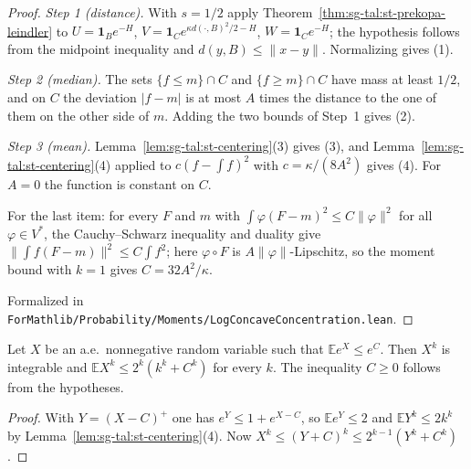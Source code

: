 \begin{proof}
  \leanok
\emph{Step 1 (distance).} With $s=1/2$ apply Theorem~\ref{thm:sg-tal:st-prekopa-leindler} to
$U=\mathbf 1_Be^{-H}$, $V=\mathbf 1_Ce^{\kappa d(\cdot,B)^2/2-H}$, $W=\mathbf 1_Ce^{-H}$; the hypothesis follows
from the midpoint inequality and $d(y,B)\le\|x-y\|$. Normalizing gives (1).

\emph{Step 2 (median).} The sets $\{f\le m\}\cap C$ and $\{f\ge m\}\cap C$ have mass at least $1/2$, and on
$C$ the deviation $|f-m|$ is at most $A$ times the distance to the one of them on the other side of $m$.
Adding the two bounds of Step~1 gives (2).

\emph{Step 3 (mean).} Lemma~\ref{lem:sg-tal:st-centering}(3) gives (3), and Lemma~\ref{lem:sg-tal:st-centering}(4)
applied to $c(f-\int f)^2$ with $c=\kappa/(8A^2)$ gives (4). For $A=0$ the function is constant on $C$.

For the last item: for every $F$ and $m$ with $\int\varphi(F-m)^2\le C\|\varphi\|^2$ for all
$\varphi\in V^*$, the Cauchy--Schwarz inequality and duality give $\|\int f(F-m)\|^2\le C\int f^2$; here
$\varphi\circ F$ is $A\|\varphi\|$-Lipschitz, so the moment bound with $k=1$ gives $C=32A^2/\kappa$.

Formalized in \texttt{ForMathlib/Probability/Moments/LogConcaveConcentration.lean}.
\end{proof}

\begin{lemma}\label{lem:sg-tal:st-exp-moment}
  \leanok
Let $X$ be an a.e.\ nonnegative random variable such that $\mathbb Ee^X\le e^C$. Then $X^k$ is integrable and
$\mathbb EX^k\le2^k(k^k+C^k)$ for every $k$. The inequality $C\ge0$ follows from the hypotheses.
\end{lemma}
\begin{proof}
  \leanok
With $Y=(X-C)^+$ one has $e^Y\le1+e^{X-C}$, so $\mathbb Ee^Y\le2$ and $\mathbb EY^k\le2k^k$ by
Lemma~\ref{lem:sg-tal:st-centering}(4). Now $X^k\le(Y+C)^k\le2^{k-1}(Y^k+C^k)$.
\end{proof}

